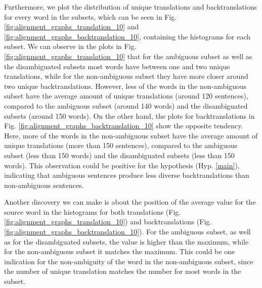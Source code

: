 Furthermore, we plot the distribution of unique translations and backtranslations for every word in the subsets, which can be seen in Fig. \ref{fig:alignment_graphs_translation_10} and \ref{fig:alignment_graphs_backtranslation_10}, containing the histograms for each subset. 
We can observe in the plots in Fig. \ref{fig:alignment_graphs_translation_10} that for the ambiguous subset as well as the disambiguated subsets most words have between one and two unique translations, while for the non-ambiguous subset they have more closer around two unique backtranslations. However, less of the words in the non-ambiguous subset have the average amount of unique translations (around 120 sentences), compared to the ambiguous subset (around 140 words) and the disambiguated subsets (around 150 words). 
On the other hand, the plots for backtranslations in Fig. \ref{fig:alignment_graphs_backtranslation_10} show the opposite tendency. Here, more of the words in the non-ambiguous subset have the average amount of unique translations (more than 150 sentences), compared to the ambiguous subset (less than 150 words) and the disambiguated subsets (less than 150 words). This observation could be positive for the hypothesis (Hyp. \ref{main}), indicating that ambiguous sentences produce less diverse backtranslations than non-ambiguous sentences.

Another discovery we can make is about the position of the average value for the source word in the histograms for both translations (Fig. \ref{fig:alignment_graphs_translation_10}) and backtranslations (Fig. \ref{fig:alignment_graphs_backtranslation_10}). For the ambiguous subset, as well as for the disambiguated subsets, the value is higher than the maximum, while for the non-ambiguous subset it matches the maximum. This could be one indication for the non-ambiguity of the word in the non-ambiguous subset, since the number of unique translation matches the number for most words in the subset. 


